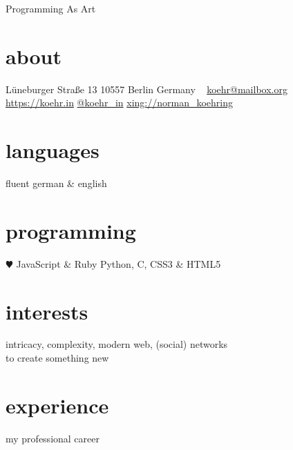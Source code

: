 \documentclass[]{friggeri-cv}
\begin{document}
       {Programming As Art}


\begin{aside}
  \section{about}
    Lüneburger Straße 13
    10557 Berlin
    Germany
    ~
    \href{mailto:koehr@mailbox.org}{koehr@mailbox.org}
    \href{https://koehr.in}{https://koehr.in}
    \href{https://twitter.com/koehr\_in}{@koehr\_in}
    \href{https://www.xing.com/profiles/Norman\_Koehring}{xing://norman\_koehring}
  \section{languages}
    fluent german \& english
  \section{programming}
    {\color{red} $\varheartsuit$} JavaScript \& Ruby
    Python, C,
    CSS3 \& HTML5
\end{aside}

\section{interests}

intricacy, complexity, modern web, (social) networks\\
to create something new

\section{experience}
my professional career
\end{document}
